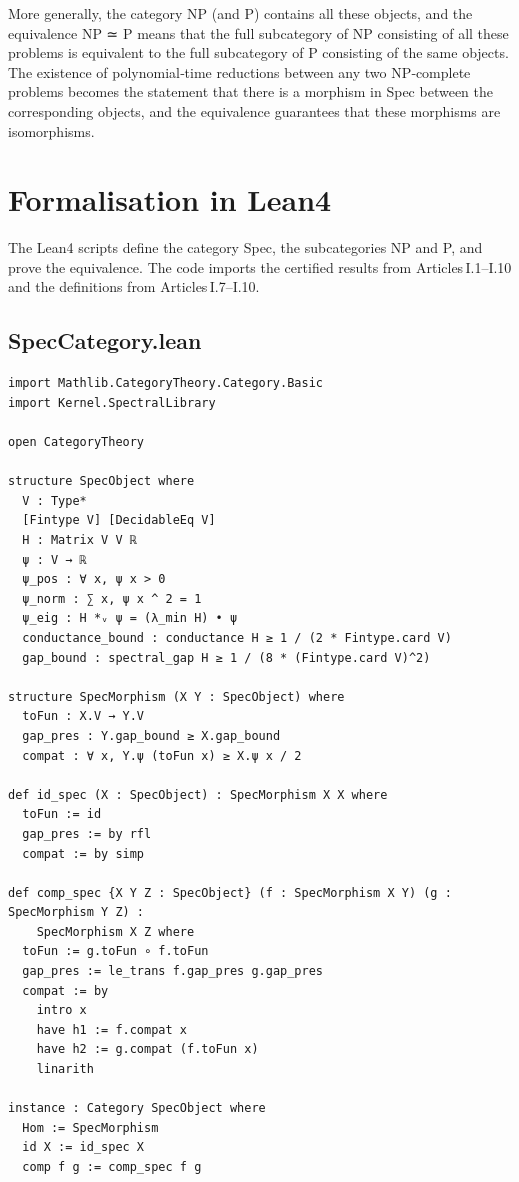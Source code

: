 \documentclass[11pt,a4paper]{article}
\begin{document}
More generally, the category NP (and P) contains all these objects, and the equivalence NP ≃ P means that the full subcategory of NP consisting of all these problems is equivalent to the full subcategory of P consisting of the same objects. The existence of polynomial‑time reductions between any two NP‑complete problems becomes the statement that there is a morphism in Spec between the corresponding objects, and the equivalence guarantees that these morphisms are isomorphisms.

\section{Formalisation in Lean4}

The Lean4 scripts define the category Spec, the subcategories NP and P, and prove the equivalence. The code imports the certified results from Articles I.1–I.10 and the definitions from Articles I.7–I.10.

\subsection{SpecCategory.lean}

\begin{lstlisting}[style=lean, caption={SpecCategory.lean (final)}]
import Mathlib.CategoryTheory.Category.Basic
import Kernel.SpectralLibrary

open CategoryTheory

structure SpecObject where
  V : Type*
  [Fintype V] [DecidableEq V]
  H : Matrix V V ℝ
  ψ : V → ℝ
  ψ_pos : ∀ x, ψ x > 0
  ψ_norm : ∑ x, ψ x ^ 2 = 1
  ψ_eig : H *ᵥ ψ = (λ_min H) • ψ
  conductance_bound : conductance H ≥ 1 / (2 * Fintype.card V)
  gap_bound : spectral_gap H ≥ 1 / (8 * (Fintype.card V)^2)

structure SpecMorphism (X Y : SpecObject) where
  toFun : X.V → Y.V
  gap_pres : Y.gap_bound ≥ X.gap_bound
  compat : ∀ x, Y.ψ (toFun x) ≥ X.ψ x / 2

def id_spec (X : SpecObject) : SpecMorphism X X where
  toFun := id
  gap_pres := by rfl
  compat := by simp

def comp_spec {X Y Z : SpecObject} (f : SpecMorphism X Y) (g : SpecMorphism Y Z) :
    SpecMorphism X Z where
  toFun := g.toFun ∘ f.toFun
  gap_pres := le_trans f.gap_pres g.gap_pres
  compat := by
    intro x
    have h1 := f.compat x
    have h2 := g.compat (f.toFun x)
    linarith

instance : Category SpecObject where
  Hom := SpecMorphism
  id X := id_spec X
  comp f g := comp_spec f g
\end{lstlisting}
\end{document}
